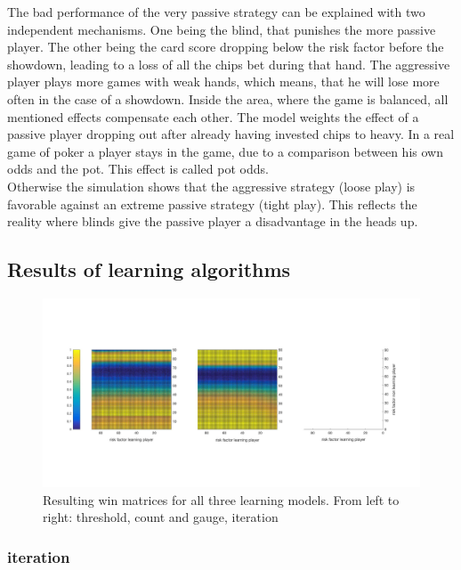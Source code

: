 \documentclass[11pt]{article}
\begin{document}
The bad performance of the very passive strategy can be explained with two independent mechanisms. One being the blind, that punishes the more passive player. The other being the card score dropping below the risk factor before the showdown, leading to a loss of all the chips bet during that hand.
The aggressive player plays more games with weak hands, which means, that he will lose more often in the case of a showdown. 
Inside the area, where the game is balanced, all mentioned effects compensate each other.
The model weights the effect of a passive player dropping out after already having invested chips to heavy. In a real game of poker a player stays in the game, due to a comparison between his own odds and the pot. This effect is called pot odds.\\
Otherwise the simulation shows that the aggressive strategy (loose play) is favorable against an extreme passive strategy (tight play). This reflects the reality where blinds give the passive player a disadvantage in the heads up.\\

\subsection{Results of learning algorithms}

\begin{figure}
\begin{center}
\includegraphics[scale=.2]{Graphics/LearningAllThreeWins}
\end{center}
\caption{Resulting win matrices for all three learning models. From left to right: threshold, count and gauge, iteration}
\label{LearningModelsAllDataOverview}
\end{figure}

\subsubsection{iteration}
\end{document}
